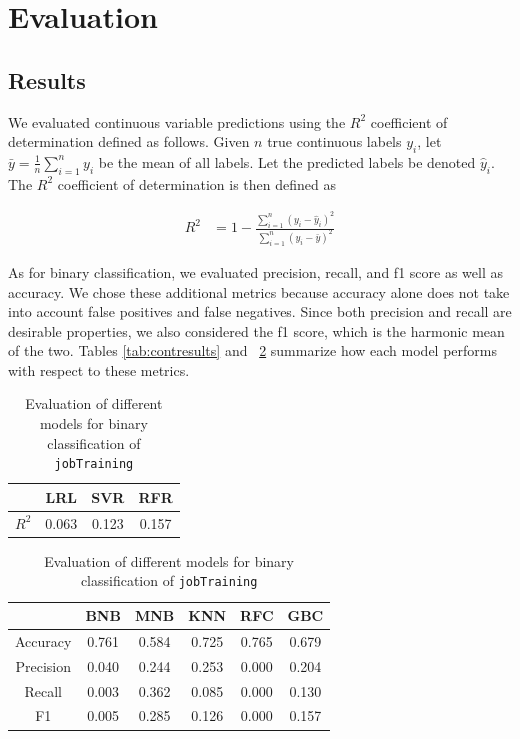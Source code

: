 \documentclass{article} %
\begin{document}
\section{Evaluation}
\label{sec:evaluation}

\subsection{Results}
\label{sec:results}

We evaluated continuous variable predictions using the $R^2$ coefficient of determination defined as follows. Given $n$ true continuous labels $y_i$, let $\bar{y} = \frac{1}{n}\sum_{i=1}^n y_i$ be the mean of all labels. Let the predicted labels be denoted $\hat{y}_i$. The $R^2$ coefficient of determination is then defined as

\begin{align*}
  R^2 &= 1 - \frac{\sum_{i=1}^n (y_i - \hat{y}_i)^2}{\sum_{i=1}^n (y_i - \bar{y})^2}
\end{align*}

As for binary classification, we evaluated precision, recall, and f1 score as well as accuracy. We chose these additional metrics because accuracy alone does not take into account false positives and false negatives. Since both precision and recall are desirable properties, we also considered the f1 score, which is the harmonic mean of the two. Tables \ref{tab:contresults} and ~\ref{tab:boolresults} summarize how each model performs with respect to these metrics.

\begin{table}[H]
  \begin{minipage}{0.30\textwidth}
    \centering
    \begin{tabular}{| c | c | c | c |}
      \hline
      ~ & LRL & SVR & RFR \\ \hline
      $R^2$ & 0.063 & 0.123 & 0.157 \\
      \hline
    \end{tabular}
    \caption{Evaluation of different models for continuous regression of \texttt{gpa}}
    \label{tab:contresults}
  \end{minipage}%
  \hfill
  \begin{minipage}{0.60\textwidth}
    \centering
    \begin{tabular}{| c | c | c | c | c | c |}
      \hline
      ~ & BNB & MNB & KNN & RFC & GBC \\ \hline
      Accuracy & 0.761 & 0.584 & 0.725 & 0.765 & 0.679 \\
      Precision & 0.040 & 0.244 & 0.253 & 0.000 & 0.204 \\
      Recall & 0.003 & 0.362 & 0.085 & 0.000 & 0.130 \\
      F1 & 0.005 & 0.285 & 0.126 & 0.000 & 0.157 \\
      \hline
    \end{tabular}
    \caption{Evaluation of different models for binary classification of \texttt{jobTraining}}
    \label{tab:boolresults}
  \end{minipage}
\end{table}
\end{document}
